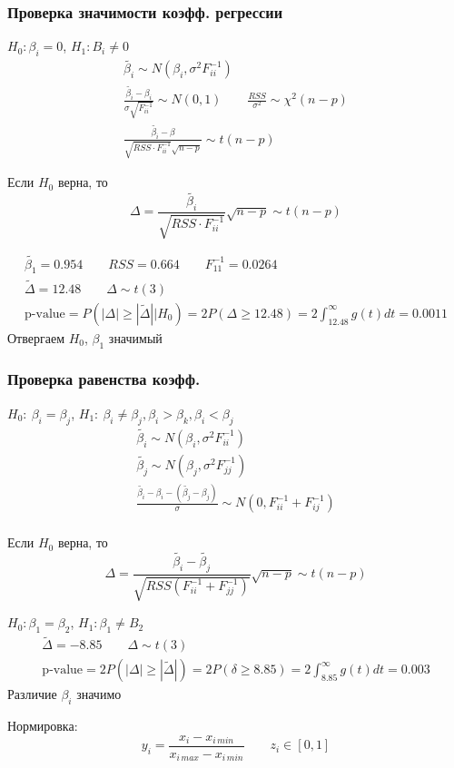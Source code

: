 \documentclass{article}
\begin{document}
\subsubsection{Проверка значимости коэфф. регрессии}
$H_0: \beta_i=0$, $H_1: B_i \neq 0$ 
\begin{gather*}
  \tilde{\beta_i}\sim N(\beta_i, \sigma^{2}F_{ii}^{-1}) \\ 
  \frac{\tilde{\beta_i}-\beta_i}{\sigma\sqrt{F_{ii}^{-1}}} \sim N(0,1) \qquad \frac{RSS}{\sigma^{2}}\sim \chi^{2}(n-p) \\ 
  \frac{\tilde{\beta_i}-\beta}{\sqrt{RSS \cdot F_{ii}^{-1}}\sqrt{n-p}}\sim t(n-p)
\end{gather*}
\begin{theorem}
  Если $H_0$ верна, то 
  \[
    \Delta = \frac{\tilde{\beta_i}}{\sqrt{RSS \cdot F_{ii}^{-1}}}\sqrt{n-p} \sim t(n-p)
  \]
\end{theorem}
\begin{eg}
  \begin{gather*}
    \tilde{\beta_1}=0.954 \qquad RSS=0.664 \qquad F_{11}^{-1}=0.0264 \\ 
    \tilde{\Delta}=12.48 \qquad \Delta \sim t(3) \\ 
    \text{p-value} = P(|\Delta| \ge |\tilde{\Delta}| \big| H_0)=
    2P(\Delta \ge 12.48) = 2 \int_{12.48}^{\infty}g(t)dt = 0.0 011
  \end{gather*}
  Отвергаем $H_0$, $\beta_1$ значимый
\end{eg}
\subsubsection{Проверка равенства коэфф.}
$H_0: \: \beta_i =\beta_j$, $H_1:\: \beta_i\neq\beta_j, \beta_i > \beta_k, \beta_i < \beta_j$
\begin{gather*}
  \tilde{\beta_i}\sim N(\beta_i, \sigma^{2}F_{ii}^{-1}) \\ 
  \tilde{\beta_j}\sim N(\beta_j, \sigma^{2}F_{jj}^{-1}) \\ 
  \frac{\tilde{\beta_i}-\beta_i - (\tilde{\beta_j}-\beta_j)}{\sigma}\sim N(0, F^{-1}_{ii}+F^{-1}_{ij}) \\ 
\end{gather*}
\begin{theorem}
  Если $H_0$ верна, то
  \[
    \Delta = \frac{\tilde{\beta_i}-\tilde{\beta_j}}{\sqrt{RSS(F^{-1}_{ii}+F^{-1}_{jj})}}\sqrt{n-p} \sim t(n-p)
  \]
\end{theorem}
\begin{eg}
  $H_0:\beta_1=\beta_2$, $H_1:\beta_1\neq B_2$
  \begin{gather*}
    \tilde{\Delta}=-8.85 \qquad \Delta \sim t(3) \\ 
    \text{p-value}=2P(|\Delta| \ge |\tilde{\Delta}|)=2P(\delta \ge 8.85)
    = 2 \int_{8.85}^{\infty}g(t)dt=0.0 03
  \end{gather*}
  Различие $\beta_i$ значимо
\end{eg}
\begin{remark}
  Нормировка:\[
    y_i = \frac{x_i-x_{i\, min}}{x_{i \, max}-x_{i \, min}} \qquad z_i \in [0,1]
  \]
\end{remark}
\end{document}
